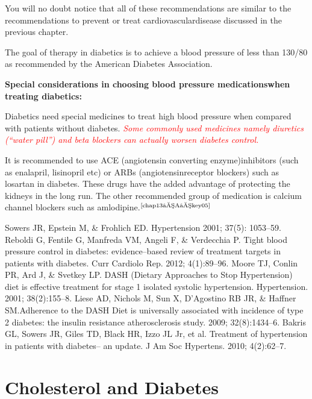 You will no doubt notice that all of these recommendations are similar to the recommendations to prevent or treat cardiovascular\break disease discussed in the previous chapter.

The goal of therapy in diabetics is to achieve a blood pressure of less than 130/80 as recommended by the American Diabetes Association.

\noindent\textbf{Special considerations in choosing blood pressure medications\break when treating diabetics:}

Diabetics need special medicines to treat high blood pressure when compared with patients without diabetes. \textcolor{red}{\textit{Some commonly used medicines namely diuretics (“water pill”) and beta blockers can actually worsen diabetes control.}}

It is recommended to use ACE (angiotensin converting enzyme)\break inhibitors (such as enalapril, lisinopril etc) or ARBs (angiotensin\break receptor blockers) such as losartan in diabetes. These drugs have the added advantage of protecting the kidneys in the long run. The other recommended group of medication is calcium channel blockers such as amlodipine.$^{\text{\cite{chap13–A–key05}}}$

\begin{thebibliography}{99}
 Sowers JR, Epstein M, \& Frohlich ED. Hypertension 2001; 37(5): 1053–59.
 Reboldi G, Fentile G, Manfreda VM, Angeli F, \& Verdecchia P. Tight blood pressure control in diabetes: evidence–based review of treatment targets in patients with diabetes. Curr Cardiolo Rep. 2012; 4(1):89–96.
 Moore TJ, Conlin PR, Ard J, \& Svetkey LP. DASH (Dietary Approaches to Stop Hypertension) diet is effective treatment for stage 1 isolated systolic hypertension. Hypertension. 2001; 38(2):155–8.
 Liese AD, Nichols M, Sun X, D’Agostino RB JR, \& Haffner SM.\break Adherence to the DASH Diet is universally associated with incidence of type 2 diabetes: the insulin resistance atherosclerosis study. 2009; 32(8):1434–6.
 Bakris GL, Sowers JR, Giles TD, Black HR, Izzo JL Jr, et al. Treatment of hypertension in patients with diabetes– an update. J Am Soc Hypertens. 2010; 4(2):62–7.
\end{thebibliography}


\chapter{Cholesterol and Diabetes}\label{chap13B}

